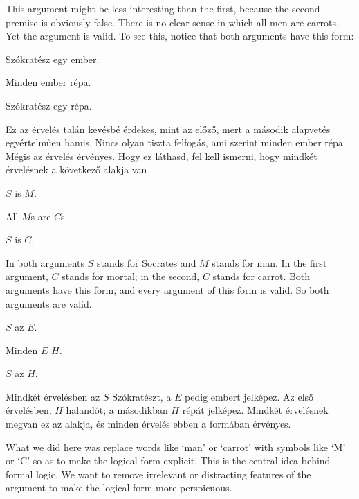 This argument might be less interesting than the first, because the second premise is obviously false. There is no clear sense in which all men are carrots. Yet the argument is valid. To see this, notice that both arguments have this form:

\begin{earg}
\item[] Szókratész egy ember.
\item[] Minden ember répa.
\item[\therefore] Szókratész egy répa.
\end{earg}

Ez az érvelés talán kevésbé érdekes, mint az előző, mert a második alapvetés egyértelműen hamis. Nincs olyan tiszta felfogás, ami szerint minden ember répa. Mégis az érvelés érvényes. Hogy ez láthasd, fel kell ismerni, hogy mindkét érvelésnek a következő alakja van

\begin{earg}
\item[] $S$ is $M$.
\item[] All $M$s are $C$s.
\item[\therefore] $S$ is $C$.
\end{earg}

In both arguments $S$ stands for Socrates and $M$ stands for man. In the first argument, $C$ stands for mortal; in the second, $C$ stands for carrot. Both arguments have this form, and every argument of this form is valid. So both arguments are valid.

\begin{earg}
\item[] $S$ az $E$.
\item[] Minden $E$ $H$.
\item[\therefore] $S$ az $H$.
\end{earg}

Mindkét érvelésben az $S$ Szókratészt, a $E$ pedig embert jelképez. Az első érvelésben, $H$ halandót; a másodikban $H$ répát jelképez. Mindkét érvelésnek megvan ez az alakja, és minden érvelés ebben a formában érvényes.


What we did here was replace words like `man' or `carrot' with symbols like `M' or `C' so as to make the logical form explicit. This is the central idea behind formal logic. We want to remove irrelevant or distracting features of the argument to make the logical form more perspicuous.

